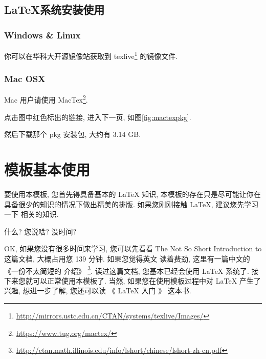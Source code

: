\documentclass[bibsec, doctor]{cugthesis}
\begin{document}
\subsection{\LaTeX{}系统安装使用}
\label{sub:xi_tong_an_zhuang_shi_yong_}
\subsubsection{Windows \& Linux}
\label{ssub:Windows_Linux}
你可以在华科大开源镜像站获取到 texlive\footnote{\url{http://mirrors.ustc.edu.cn/CTAN/systems/texlive/Images/}}
的镜像文件.

\subsubsection{Mac OSX}
\label{ssub:Mac_OSX}
Mac 用户请使用 MacTex\footnote{\url{https://www.tug.org/mactex/}}.


点击图中红色标出的链接, 进入下一页, 如图\ref{fig:mactexpkg}.


然后下载那个 pkg 安装包, 大约有 3.14 GB\@.
\section{模板基本使用}
\label{sec:mo_ban_ji_ben_shi_yong_}
要使用本模板, 您首先得具备基本的 \LaTeX{} 知识, 本模板的存在只是尽可能让你在
具备很少的知识的情况下做出精美的排版. 如果您刚刚接触 \LaTeX{}, 建议您先学习一下
相关的知识. 

什么? 您说啥? 没时间?

OK, 如果您没有很多时间来学习, 您可以先看看 The Not So Short Introduction to 
\LaTeXe{} \cite{oetiker_not_2018} 这篇文档, 大概占用您 139 分钟. 如果您觉得英文
读着费劲, 这里有一篇中文的《一份不太简短的 \LaTeXe{} 介绍》
\footnote{\url{http://ctan.math.illinois.edu/info/lshort/chinese/lshort-zh-cn.pdf}}.
读过这篇文档, 您基本已经会使用 \LaTeX{} 系统了. 接下来您就可以正常使用本模板了.
当然, 如果您在使用模板过程中对 \LaTeX{} 产生了兴趣, 想进一步了解, 您还可以读
《 \LaTeX{} 入门 》\cite{_latex_2013} 这本书.
\end{document}
